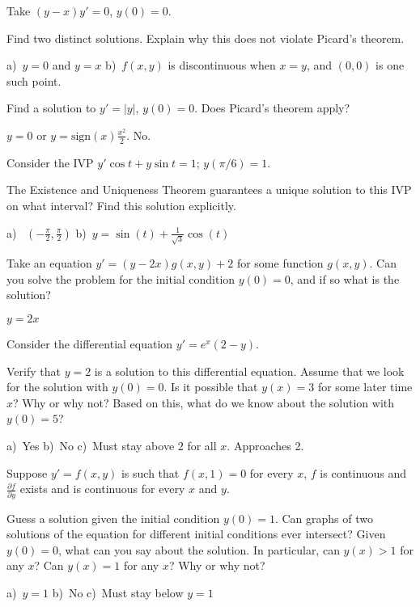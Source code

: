 \begin{exercise}[challenging]
Take $(y-x)y' = 0$, $y(0) = 0$.
\begin{tasks}
\task Find two distinct solutions.
\task Explain why this does not violate Picard's theorem.  
\end{tasks}
\end{exercise}
\comboSol{%
}
{%
a)~$y=0$ and $y=x$ \quad b)~$f(x,y)$ is discontinuous when $x=y$, and $(0,0)$ is one such point.
}

\begin{exercise}
Find a solution to $y' = \lvert y \rvert$, $y(0) = 0$.  Does Picard's theorem apply?
\end{exercise}
\comboSol{%
}
{%
$y=0$ or $y = \text{sign}(x)\frac{x^2}{2}$. No.
}

\begin{exercise}
Consider the IVP $y'\cos t+y\sin t=1; \, y(\pi/6)=1$.%
\begin{tasks}
\task The Existence and Uniqueness Theorem guarantees a unique solution to this IVP on what interval?
\task Find this solution explicitly.
\end{tasks}
\end{exercise}
\comboSol{%
}
{%
a)~ $\left(-\frac{\pi}{2}, \frac{\pi}{2}\right)$ \quad b)~$y = \sin(t) + \frac{1}{\sqrt{3}}\cos(t)$
}

\begin{exercise}
Take an equation $y' = (y-2x) g(x,y) + 2$ for some function $g(x,y)$.
Can you solve the problem for the
initial condition $y(0) = 0$,
and if so what is the solution?
\end{exercise}
\comboSol{%
}
{%
$y = 2x$
}

\begin{exercise}
Consider the differential equation $y' = e^x(2-y)$.
\begin{tasks}
\task Verify that $y = 2$ is a solution to this differential equation.
\task Assume that we look for the solution with $y(0) = 0$. Is it possible that $y(x) = 3$ for some later time $x$? Why or why not?
\task Based on this, what do we know about the solution with $y(0) = 5$?
\end{tasks}
\end{exercise}
\comboSol{%
}
{%
a)~Yes \quad b)~No \quad c)~Must stay above $2$ for all $x$. Approaches 2.
}

\begin{exercise}[challenging]
\pagebreak[2]
Suppose $y' = f(x,y)$ is such that $f(x,1) = 0$ for every $x$,
$f$ is continuous and $\frac{\partial f}{\partial y}$ exists and
is continuous for every $x$ and $y$.
\begin{tasks}
\task
Guess a solution given the initial condition
$y(0) = 1$.
\task
Can graphs of two solutions of the equation for different initial conditions
ever intersect?
\task
Given $y(0) = 0$, what can you say about the solution.  In particular,
can $y(x) > 1$ for any $x$?  Can $y(x) = 1$ for any $x$?  Why or why not?
\end{tasks}
\end{exercise}
\comboSol{%
}
{%
a)~$y=1$ \quad b)~No \quad c)~Must stay below $y=1$
}

